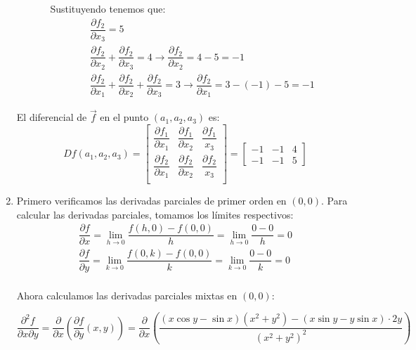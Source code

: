 \begin{enumerate}[label=\color{red}\textbf{\arabic*)}, leftmargin=*]
\begin{itemize}
\begin{enumerate}[label=\arabic*)]
	Sustituyendo tenemos que: \[ \begin{array}{l}
		\dfrac{\partial f_2}{\partial x_3}=5\\
		\dfrac{\partial f_2}{\partial x_2}+\dfrac{\partial f_2}{\partial x_3}=4\longrightarrow \dfrac{\partial f_2}{\partial x_2}=4-5=-1\\
		\dfrac{\partial f_2}{\partial x_1}+\dfrac{\partial f_2}{\partial x_2}+\dfrac{\partial f_2}{\partial x_3}=3\longrightarrow \dfrac{\partial f_2}{\partial x_1}=3-(-1)-5=-1
		\end{array} \]
\end{enumerate}
\end{itemize}
El diferencial de $\vec{f}$ en el punto $(a_1,a_2,a_3)$ es: \[ Df(a_1,a_2,a_3)=\begin{bmatrix}
\dfrac{\partial f_1}{\partial x_1} & \dfrac{\partial f_1}{\partial x_2} & \dfrac{\partial f_1}{x_3}\\
\dfrac{\partial f_2}{\partial x_1} & \dfrac{\partial f_2}{\partial x_2} & \dfrac{\partial f_2}{x_3}\\
\end{bmatrix}=\begin{bmatrix}
-1 & -1 & 4 \\
-1 & -1 & 5
\end{bmatrix} \]

\item {}

Primero verificamos las derivadas parciales de primer orden en $(0,0)$. Para calcular las derivadas parciales, tomamos los límites respectivos: \[ \begin{array}{l}
\dfrac{\partial f}{\partial x}=\lim_{h\to 0}\dfrac{f(h,0)-f(0,0)}{h}=\lim_{h\to0}\dfrac{0-0}{h}=0\\
\dfrac{\partial f}{\partial y}=\lim_{k\to 0}\dfrac{f(0,k)-f(0,0)}{k}=\lim_{k\to0}\dfrac{0-0}{k}=0\\
\end{array} \]

Ahora calculamos las derivadas parciales mixtas en $(0,0)$:

$\dfrac{\partial^2 f}{\partial x\partial y}=\dfrac{\partial}{\partial x}\left(\dfrac{\partial f}{\partial y}(x,y)\right)=\dfrac{\partial }{\partial x}\left(\dfrac{(x\cos y-\sin x)(x^2+y^2)-(x\sin y-y\sin x)\cdot 2y}{(x^2+y^2)^2}\right)$


\end{enumerate}
